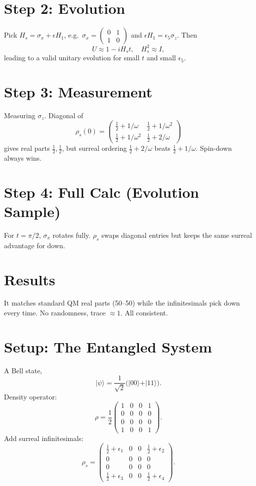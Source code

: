 \documentclass{article}
\begin{document}
\section{Step 2: Evolution}
Pick \(H_s = \sigma_x + \epsilon H_1\), e.g.\ \(\sigma_x = \begin{pmatrix} 0 & 1 \\ 1 & 0 \end{pmatrix}\) and \(\epsilon H_1 = \epsilon_5 \sigma_z\). Then
\[
U \approx 1 - i H_s t,\quad H_s^2 \approx I,
\]
leading to a valid unitary evolution for small \(t\) and small \(\epsilon_5\).

\section{Step 3: Measurement}
Measuring \(\sigma_z\). Diagonal of 
\[
\rho_s(0) = 
\begin{pmatrix}
\tfrac12 + 1/\omega & \tfrac12 + 1/\omega^2 \\
\tfrac12 + 1/\omega^2 & \tfrac12 + 2/\omega
\end{pmatrix}
\]
gives real parts \(\tfrac12,\tfrac12\), but surreal ordering \(\tfrac12 + 2/\omega\) beats \(\tfrac12 + 1/\omega\). Spin-down always wins.

\section{Step 4: Full Calc (Evolution Sample)}
For \(t = \pi/2\), \(\sigma_x\) rotates fully. \(\rho_s\) swaps diagonal entries but keeps the same surreal advantage for down.

\section{Results}
It matches standard QM real parts (50--50) while the infinitesimals pick down every time. No randomness, trace \(\approx 1\). All consistent.

\section{Setup: The Entangled System}
A Bell state,
\[
\vert \psi \rangle = \frac{1}{\sqrt{2}} \bigl(\vert 0 0 \rangle + \vert 1 1 \rangle\bigr).
\]
Density operator:
\[
\rho = \frac12 
\begin{pmatrix}
1 & 0 & 0 & 1 \\
0 & 0 & 0 & 0 \\
0 & 0 & 0 & 0 \\
1 & 0 & 0 & 1
\end{pmatrix}.
\]
Add surreal infinitesimals:
\[
\rho_s = 
\begin{pmatrix}
\tfrac12 + \epsilon_1 & 0 & 0 & \tfrac12 + \epsilon_2 \\
0 & 0 & 0 & 0 \\
0 & 0 & 0 & 0 \\
\tfrac12 + \epsilon_3 & 0 & 0 & \tfrac12 + \epsilon_4
\end{pmatrix}.
\]
\end{document}
